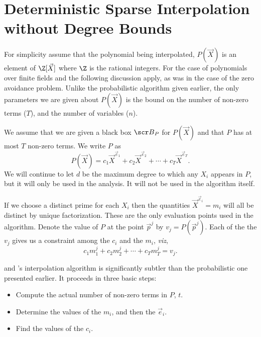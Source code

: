 \section{Deterministic Sparse Interpolation without Degree Bounds}
\label{Interp:BenOr:Sec}

For simplicity assume that the polynomial being interpolated, $P(\vec
X)$ is an element of $\Z[\vec X]$ where $\Z$ is the rational integers.
For the case of polynomials over finite fields
 and the following discussion apply, as was
in the case of the zero avoidance problem.  Unlike the probabilistic
algorithm given earlier, the only parameters we are given about
$P(\vec X)$ is the bound on the number of non-zero terms ($T$), and
the number of variables ($n$).

We assume that we are given a black box ${\scr B}_P$ for $P(\vec{X})$
and that $P$ has at most $T$ non-zero terms.  We write $P$ as
\[
P(\vec X) = c_1 {\vec X}^{\vec e_1} + c_2 {\vec X}^{\vec e_2} + \cdots +
c_T {\vec X}^{\vec e_T}.
\]
We will continue to let $d$ be the maximum degree to which any
$X_i$ appears in $P$, but it will only be used in the analysis.  It
will not be used in the algorithm itself.

If we choose a distinct prime for each $X_i$ then the quantities
${\vec X}^{\vec e_i} = m_i$ will all be distinct by unique
factorization.  These are the only evaluation points used in the
algorithm.  Denote the value of $P$ at the point ${\vec p}^j$ by $v_j
= P({\vec p}^j)$.  Each of the the $v_j$ gives us a constraint among
the $c_i$ and the $m_i$, {\em viz\/},
\begin{equation}
c_1 m_1^j + c_2 m_2^j + \cdots + c_T m_T^j = v_j.
\label{Eq:d}
\end{equation}

{\BenOr} and {\Tiwari}'s interpolation algorithm is significantly
subtler than the probabilistic one presented earlier.  It proceeds in
three basic steps:

\begin{itemize}

\item Compute the actual number of non-zero terms in $P$, $t$.

\item Determine the values of the $m_i$, and then the $\vec e_i$.

\item Find the values of the $c_i$.

\end{itemize}

